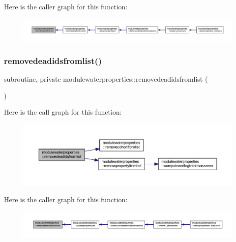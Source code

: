 Here is the caller graph for this function\+:\nopagebreak
\begin{figure}[H]
\begin{center}
\leavevmode
\includegraphics[width=350pt]{namespacemodulewaterproperties_a3ee71384b4a5e160513a569765f2a4ba_icgraph}
\end{center}
\end{figure}
\mbox{\label{namespacemodulewaterproperties_a474948faf0bbb3ab44002a8cce97817b}} 
\subsubsection{\texorpdfstring{removedeadidsfromlist()}{removedeadidsfromlist()}}
{\footnotesize\ttfamily subroutine, private modulewaterproperties\+::removedeadidsfromlist (\begin{DoxyParamCaption}{ }\end{DoxyParamCaption})\hspace{0.3cm}{\ttfamily [private]}}

Here is the call graph for this function\+:\nopagebreak
\begin{figure}[H]
\begin{center}
\leavevmode
\includegraphics[width=350pt]{namespacemodulewaterproperties_a474948faf0bbb3ab44002a8cce97817b_cgraph}
\end{center}
\end{figure}
Here is the caller graph for this function\+:\nopagebreak
\begin{figure}[H]
\begin{center}
\leavevmode
\includegraphics[width=350pt]{namespacemodulewaterproperties_a474948faf0bbb3ab44002a8cce97817b_icgraph}
\end{center}
\end{figure}
\mbox{\label{namespacemodulewaterproperties_a3d6f2d4c903cf8071d0cba596db412f1}} 
